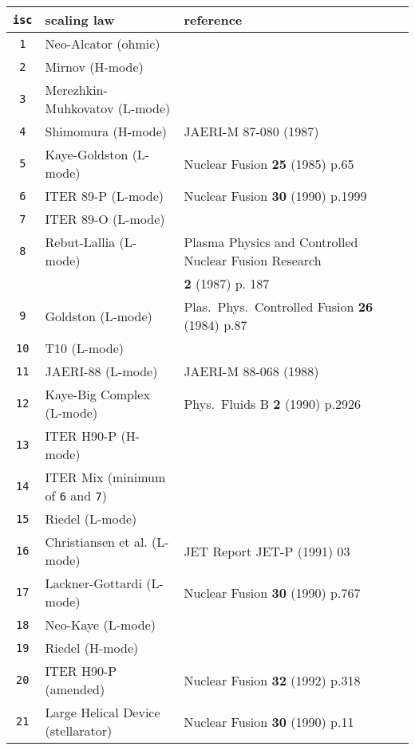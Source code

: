 \documentclass[11pt,a4paper]{report}
\begin{document}
\begin{table}[tbph]
\begin{center}
\footnotesize
\begin{tabular}{||c||l|l||} \hline
\texttt{isc} & scaling law & reference \\ \hline
\texttt{1}  & Neo-Alcator (ohmic) & \cite{IPDG} \\
\texttt{2}  & Mirnov (H-mode) & \cite{IPDG} \\
\texttt{3}  & Merezhkin-Muhkovatov (L-mode) & \cite{IPDG} \\
\texttt{4}  & Shimomura (H-mode) & JAERI-M 87-080 (1987) \\
\texttt{5}  & Kaye-Goldston (L-mode) & Nuclear Fusion \textbf{25} (1985) p.65 \\
\texttt{6}  & ITER 89-P (L-mode) & Nuclear Fusion \textbf{30} (1990) p.1999 \\
\texttt{7}  & ITER 89-O (L-mode) & \cite{IPDG} \\
\texttt{8}  & Rebut-Lallia (L-mode) & Plasma Physics and Controlled Nuclear Fusion
Research \\
 & &  \textbf{2} (1987) p. 187 \\
\texttt{9}  & Goldston (L-mode) & Plas.\ Phys.\ Controlled Fusion \textbf{26} (1984) p.87 \\
\texttt{10} & T10 (L-mode) & \cite{IPDG} \\
\texttt{11} & JAERI-88 (L-mode) & JAERI-M 88-068 (1988) \\
\texttt{12} & Kaye-Big Complex (L-mode) & Phys.\ Fluids B \textbf{2} (1990) p.2926 \\
\texttt{13} & ITER H90-P (H-mode) &  \\
\texttt{14} & ITER Mix (minimum of \texttt{6} and \texttt{7}) &  \\
\texttt{15} & Riedel (L-mode) &  \\
\texttt{16} & Christiansen et al. (L-mode) & JET Report JET-P (1991) 03 \\
\texttt{17} & Lackner-Gottardi (L-mode) & Nuclear Fusion \textbf{30} (1990) p.767  \\
\texttt{18} & Neo-Kaye (L-mode) & \cite{IPDG} \\
\texttt{19} & Riedel (H-mode) &  \\
\texttt{20} & ITER H90-P (amended) & Nuclear Fusion \textbf{32} (1992) p.318 \\
\texttt{21} & Large Helical Device (stellarator) & Nuclear Fusion \textbf{30} (1990)
p.11 \\

\end{tabular}
\end{center}
\end{table}
\end{document}
